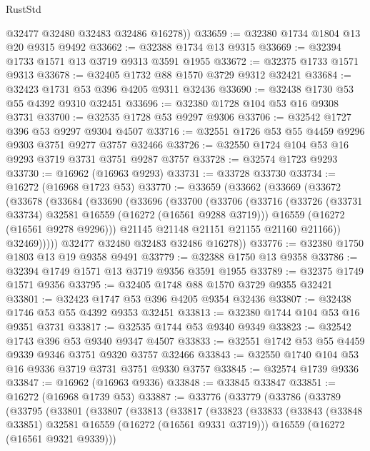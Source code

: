 \begin{lexlean}{RustStd}
\begin{coremodule}
        @32477
        @32480
        @32483
        @32486
        @16278))
@33659 := @32380 @1734 @1804 @13 @20 @9315 @9492
@33662 := @32388 @1734 @13 @9315
@33669 := @32394 @1733 @1571 @13 @3719 @9313 @3591 @1955
@33672 := @32375 @1733 @1571 @9313
@33678 := @32405 @1732 @88 @1570 @3729 @9312 @32421
@33684 := @32423 @1731 @53 @396 @4205 @9311 @32436
@33690 := @32438 @1730 @53 @55 @4392 @9310 @32451
@33696 := @32380 @1728 @104 @53 @16 @9308 @3731
@33700 := @32535 @1728 @53 @9297 @9306
@33706 := @32542 @1727 @396 @53 @9297 @9304 @4507
@33716 := @32551 @1726 @53 @55 @4459 @9296 @9303 @3751 @9277 @3757 @32466
@33726 := @32550 @1724 @104 @53 @16 @9293 @3719 @3731 @3751 @9287 @3757
@33728 := @32574 @1723 @9293
@33730 := @16962 (@16963 @9293)
@33731 := @33728 @33730
@33734 := @16272 (@16968 @1723 @53)
@33770 := @33659
    (@33662
      (@33669
        (@33672
          (@33678
            (@33684
              (@33690
                (@33696
                  (@33700
                    (@33706
                      (@33716
                        (@33726 (@33731 @33734) @32581 @16559 (@16272 (@16561 @9288 @3719)))
                        @16559
                        (@16272 (@16561 @9278 @9296)))
                      @21145
                      @21148
                      @21151
                      @21155
                      @21160
                      @21166))
                  @32469)))))
        @32477
        @32480
        @32483
        @32486
        @16278))
@33776 := @32380 @1750 @1803 @13 @19 @9358 @9491
@33779 := @32388 @1750 @13 @9358
@33786 := @32394 @1749 @1571 @13 @3719 @9356 @3591 @1955
@33789 := @32375 @1749 @1571 @9356
@33795 := @32405 @1748 @88 @1570 @3729 @9355 @32421
@33801 := @32423 @1747 @53 @396 @4205 @9354 @32436
@33807 := @32438 @1746 @53 @55 @4392 @9353 @32451
@33813 := @32380 @1744 @104 @53 @16 @9351 @3731
@33817 := @32535 @1744 @53 @9340 @9349
@33823 := @32542 @1743 @396 @53 @9340 @9347 @4507
@33833 := @32551 @1742 @53 @55 @4459 @9339 @9346 @3751 @9320 @3757 @32466
@33843 := @32550 @1740 @104 @53 @16 @9336 @3719 @3731 @3751 @9330 @3757
@33845 := @32574 @1739 @9336
@33847 := @16962 (@16963 @9336)
@33848 := @33845 @33847
@33851 := @16272 (@16968 @1739 @53)
@33887 := @33776
    (@33779
      (@33786
        (@33789
          (@33795
            (@33801
              (@33807
                (@33813
                  (@33817
                    (@33823
                      (@33833
                        (@33843 (@33848 @33851) @32581 @16559 (@16272 (@16561 @9331 @3719)))
                        @16559
                        (@16272 (@16561 @9321 @9339)))

\end{coremodule}
\end{lexlean}
